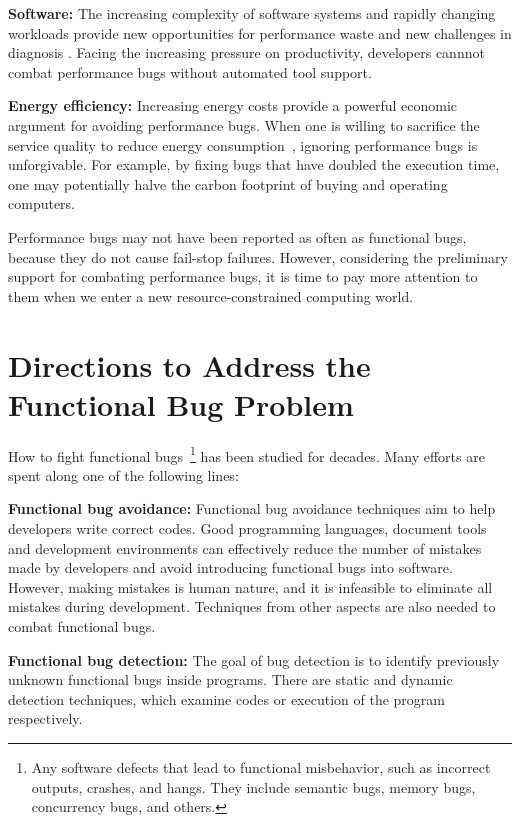 {\bf Software:} The increasing complexity of software systems and rapidly 
changing workloads provide new opportunities for performance waste and
new challenges in diagnosis
\citep{BloatFSE2008}.
Facing the increasing pressure on productivity, 
developers cannnot combat performance bugs without automated tool support. 

{\bf Energy efficiency:} 
Increasing energy costs provide a powerful economic 
argument for avoiding performance bugs. 
When one is willing to sacrifice the service quality to reduce 
energy consumption~\citep{green.pldi10,asplos11karthik}, 
ignoring performance bugs is unforgivable.
For example, by fixing bugs that have doubled the
execution time,
one may potentially
halve the carbon footprint of buying and operating computers.

Performance bugs may not have been reported as often as functional bugs, because 
they do not cause fail-stop failures.
However, considering the preliminary support for
combating performance bugs,
it is time to pay more attention to them
when we enter a new resource-constrained computing world.

\section{Directions to Address the Functional Bug Problem}
How to fight functional bugs~\footnote{Any software defects that lead to functional misbehavior,
such as incorrect outputs, crashes, and hangs. They include
semantic bugs, memory bugs, concurrency bugs, and others.} has been studied for decades.
Many efforts are spent along one of the following lines:

{\bf Functional bug avoidance:}
Functional bug avoidance techniques aim to help developers write correct codes. Good programming languages,
document tools and development environments can effectively reduce the number of mistakes made by developers
and avoid introducing functional bugs into software.
However, making mistakes is human nature,
and it is infeasible to eliminate all mistakes during development.
Techniques from other aspects are also needed to combat functional bugs.

{\bf Functional bug detection:}
The goal of bug detection is to identify previously
unknown functional bugs inside programs.
There are static and dynamic detection techniques,
which examine codes or execution of the program respectively.

